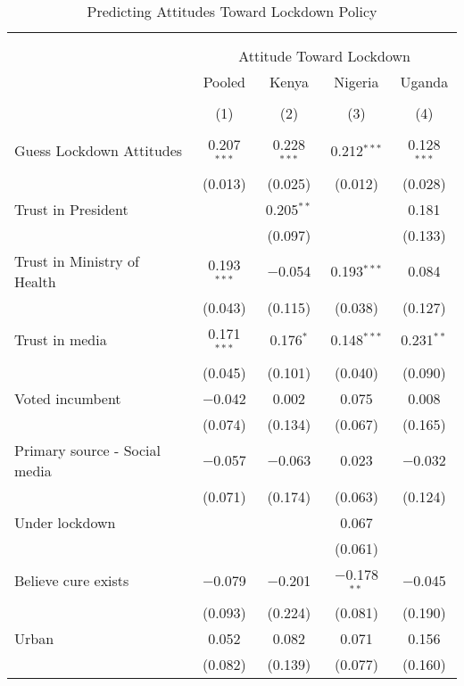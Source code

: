 
\begin{table}[!htbp] \centering 
  \caption{Predicting Attitudes Toward Lockdown Policy} 
  \label{si:pred_att_lock_full} 
\scriptsize 
\begin{tabular}{@{\extracolsep{5pt}}lcccc} 
\\[-1.8ex]\hline 
\hline \\[-1.8ex] 
\\[-1.8ex] & \multicolumn{4}{c}{Attitude Toward Lockdown} \\ 
 & Pooled & Kenya & Nigeria & Uganda \\ 
\\[-1.8ex] & (1) & (2) & (3) & (4)\\ 
\hline \\[-1.8ex] 
 Guess Lockdown Attitudes & 0.207$^{***}$ & 0.228$^{***}$ & 0.212$^{***}$ & 0.128$^{***}$ \\ 
  & (0.013) & (0.025) & (0.012) & (0.028) \\ 
  Trust in President &  & 0.205$^{**}$ &  & 0.181 \\ 
  &  & (0.097) &  & (0.133) \\ 
  Trust in Ministry of Health & 0.193$^{***}$ & $-$0.054 & 0.193$^{***}$ & 0.084 \\ 
  & (0.043) & (0.115) & (0.038) & (0.127) \\ 
  Trust in media & 0.171$^{***}$ & 0.176$^{*}$ & 0.148$^{***}$ & 0.231$^{**}$ \\ 
  & (0.045) & (0.101) & (0.040) & (0.090) \\ 
  Voted incumbent & $-$0.042 & 0.002 & 0.075 & 0.008 \\ 
  & (0.074) & (0.134) & (0.067) & (0.165) \\ 
  Primary source - Social media & $-$0.057 & $-$0.063 & 0.023 & $-$0.032 \\ 
  & (0.071) & (0.174) & (0.063) & (0.124) \\ 
  Under lockdown &  &  & 0.067 &  \\ 
  &  &  & (0.061) &  \\ 
  Believe cure exists & $-$0.079 & $-$0.201 & $-$0.178$^{**}$ & $-$0.045 \\ 
  & (0.093) & (0.224) & (0.081) & (0.190) \\ 
  Urban & 0.052 & 0.082 & 0.071 & 0.156 \\ 
  & (0.082) & (0.139) & (0.077) & (0.160) \\ 

\end{tabular}
\end{table}

